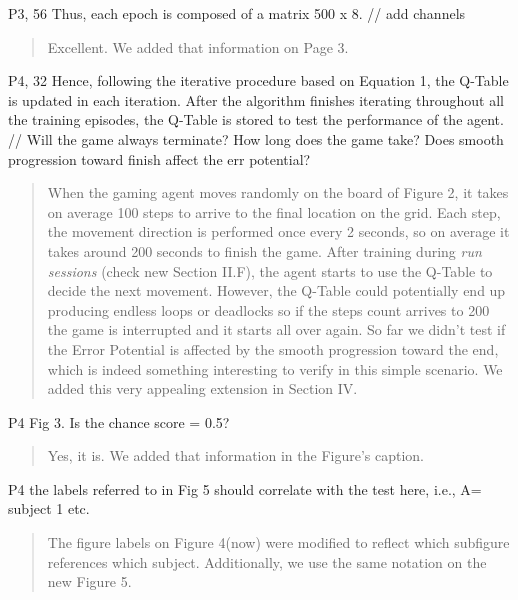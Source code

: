 \documentclass[journal,onecolumn,12pt]{IEEEtran}
\begin{document}
P3, 56 Thus, each epoch is composed of a matrix 500 x 8. // add channels

\vspace{2em}
\begin{quotation}
{\color{blue}
Excellent.  We added that information on Page 3.
}
\end{quotation}
\vspace{2em}

P4, 32 Hence, following the iterative procedure based on Equation 1, the Q-Table is updated in each iteration. After the algorithm finishes iterating throughout all the training episodes, the Q-Table is stored to test the performance of the agent.
// Will the game always terminate? How long does the game take? Does smooth progression toward finish affect the err potential?

\vspace{2em}
\begin{quotation}
{\color{blue}

When the gaming agent moves randomly on the board of Figure 2, it takes on average 100 steps to arrive to the final location on the grid.  Each step, the movement direction is performed once every 2 seconds, so on average it takes around 200 seconds to finish the game.  After training during \textit{run sessions} (check new Section II.F), the agent starts to use the Q-Table to decide the next movement.  However, the Q-Table could potentially end up producing endless loops or deadlocks so if the steps count arrives to 200 the game is interrupted and it starts all over again.
So far we didn't test if the Error Potential is affected by the smooth progression toward the end, which is indeed something interesting to verify in this simple scenario.  We added this very appealing extension in Section IV.

}
\end{quotation}
\vspace{2em}

P4 Fig 3. Is the chance score = 0.5?

\vspace{2em}
\begin{quotation}
{\color{blue}
Yes, it is.  We added that information in the Figure's caption.
}
\end{quotation}
\vspace{2em}

P4 the labels referred to in Fig 5 should correlate with the test here, i.e., A= subject 1 etc.

\vspace{2em}
\begin{quotation}
{\color{blue}
The figure labels on Figure 4(now) were modified to reflect which subfigure references which subject.  Additionally, we use the same notation on the new Figure 5.
} 
\end{quotation}
\vspace{2em}
\end{document}
